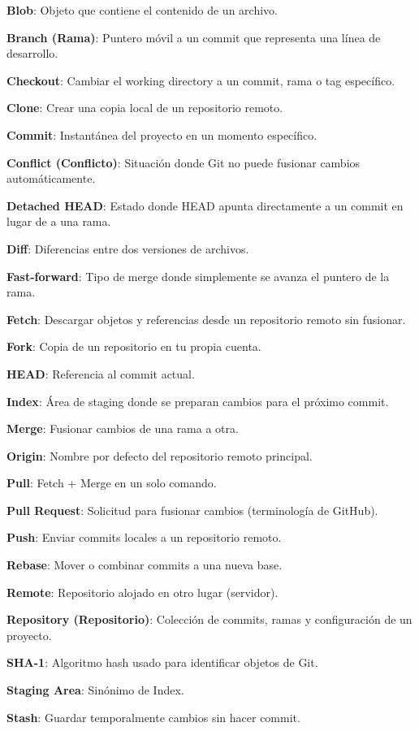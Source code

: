 \documentclass[
  doc,
  floatsintext,
  longtable,
  a4paper,
  nolmodern,
  notxfonts,
  notimes,
  12pt,
  colorlinks=true,linkcolor=blue,citecolor=blue,urlcolor=blue]{apa7}
\begin{document}
\textbf{Blob}: Objeto que contiene el contenido de un archivo.

\textbf{Branch (Rama)}: Puntero móvil a un commit que representa una
línea de desarrollo.

\textbf{Checkout}: Cambiar el working directory a un commit, rama o tag
específico.

\textbf{Clone}: Crear una copia local de un repositorio remoto.

\textbf{Commit}: Instantánea del proyecto en un momento específico.

\textbf{Conflict (Conflicto)}: Situación donde Git no puede fusionar
cambios automáticamente.

\textbf{Detached HEAD}: Estado donde HEAD apunta directamente a un
commit en lugar de a una rama.

\textbf{Diff}: Diferencias entre dos versiones de archivos.

\textbf{Fast-forward}: Tipo de merge donde simplemente se avanza el
puntero de la rama.

\textbf{Fetch}: Descargar objetos y referencias desde un repositorio
remoto sin fusionar.

\textbf{Fork}: Copia de un repositorio en tu propia cuenta.

\textbf{HEAD}: Referencia al commit actual.

\textbf{Index}: Área de staging donde se preparan cambios para el
próximo commit.

\textbf{Merge}: Fusionar cambios de una rama a otra.

\textbf{Origin}: Nombre por defecto del repositorio remoto principal.

\textbf{Pull}: Fetch + Merge en un solo comando.

\textbf{Pull Request}: Solicitud para fusionar cambios (terminología de
GitHub).

\textbf{Push}: Enviar commits locales a un repositorio remoto.

\textbf{Rebase}: Mover o combinar commits a una nueva base.

\textbf{Remote}: Repositorio alojado en otro lugar (servidor).

\textbf{Repository (Repositorio)}: Colección de commits, ramas y
configuración de un proyecto.

\textbf{SHA-1}: Algoritmo hash usado para identificar objetos de Git.

\textbf{Staging Area}: Sinónimo de Index.

\textbf{Stash}: Guardar temporalmente cambios sin hacer commit.
\end{document}

